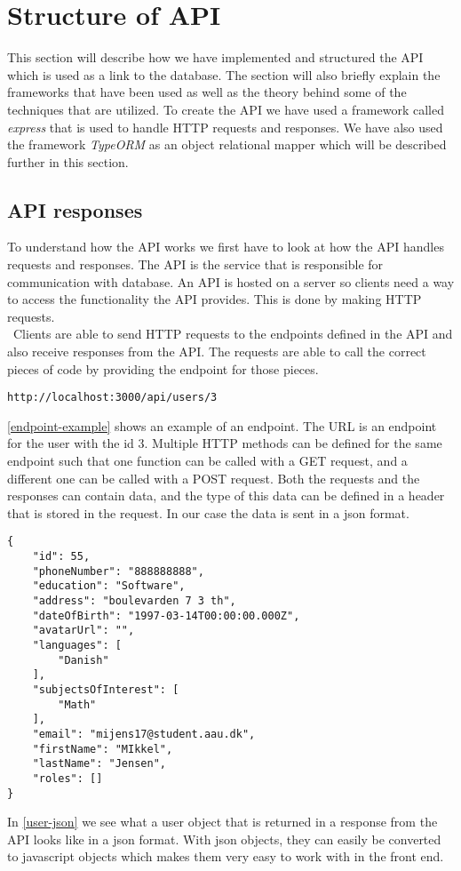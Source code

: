 \section{Structure of API}
This section will describe how we have implemented and structured the API which is used as a link to the database.
The section will also briefly explain the frameworks that have been used as well as the theory behind some of the techniques that are utilized.
To create the API we have used a framework called \textit{express} that is used to handle HTTP requests and responses.
We have also used the framework \textit{TypeORM} as an object relational mapper which will be described further in this section.

\subsection{API responses}
To understand how the API works we first have to look at how the API handles requests and responses.
The API is the service that is responsible for communication with database. 
An API is hosted on a server so clients need a way to access the functionality the API provides.
This is done by making HTTP requests. 
\\\
Clients are able to send HTTP requests to the endpoints defined in the API and also receive responses from the API.
The requests are able to call the correct pieces of code by providing the endpoint for those pieces.
\begin{center}\label{endpoint-example}
    \texttt{http://localhost:3000/api/users/3}
\end{center}
\autoref{endpoint-example} shows an example of an endpoint.
The URL is an endpoint for the user with the id 3.
Multiple HTTP methods can be defined for the same endpoint such that one function can be called with a GET request, and a different one can be called with a POST request. 
Both the requests and the responses can contain data, and the type of this data can be defined in a header that is stored in the request.
In our case the data is sent in a json format.
\begin{lstlisting}[caption={Shows how a user object looks in a json format}, captionpos=b, label={user-json}]
{
    "id": 55,
    "phoneNumber": "888888888",
    "education": "Software",
    "address": "boulevarden 7 3 th",
    "dateOfBirth": "1997-03-14T00:00:00.000Z",
    "avatarUrl": "",
    "languages": [
        "Danish"
    ],
    "subjectsOfInterest": [
        "Math"
    ],
    "email": "mijens17@student.aau.dk",
    "firstName": "MIkkel",
    "lastName": "Jensen",
    "roles": []
}
\end{lstlisting}
In \autoref{user-json} we see what a user object that is returned in a response from the API looks like in a json format. 
With json objects, they can easily be converted to javascript objects which makes them very easy to work with in the front end. 
